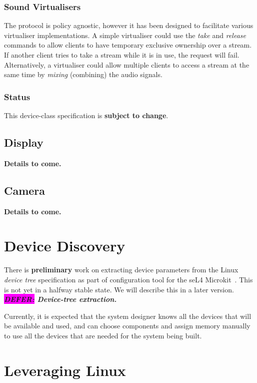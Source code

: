 \documentclass[a4paper,12pt]{report}
\newcommand{\DEFER}[1]{\textbf{\textsl{\colorbox{magenta}{DEFER:} #1}}}
\newcommand{\DEFER}[1]{\relax}
\newcommand{\ToCome}[1]{\textbf{#1 to come.}}
\begin{document}
\subsection{Sound Virtualisers}

The protocol is policy agnostic, however it has been designed to facilitate
various virtualiser implementations. A simple virtualiser could use the
\textit{take} and \textit{release} commands to allow clients to have temporary
exclusive ownership over a stream. If another client tries to take a stream
while it is in use, the request will fail. Alternatively, a virtualiser could
allow multiple clients to access a stream at the same time by \textit{mixing}
(combining) the audio signals.


\subsection{Status}

This device-class specification is \textbf{subject to change}.

\section{Display}

\ToCome{Details}

\section{Camera}

\ToCome{Details}



\chapter{Device Discovery}

There is \textbf{preliminary} work on extracting device parameters
from the Linux \emph{device tree} specification as part of
configuration tool for the seL4 Microkit~\citep{microkit:url}.
This is not yet in a halfway stable state. We will
describe this in a later version. \DEFER{Device-tree extraction.}

Currently, it is expected that the system designer knows all the
devices that will be available and used, and can choose components and
assign memory manually to use all the devices that are needed for the
system being built.

\chapter{Leveraging Linux}\label{s:linux}
\end{document}

